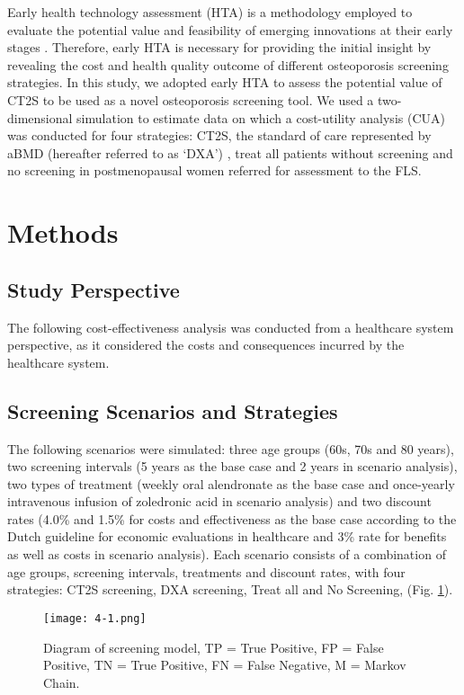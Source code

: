 Early health technology assessment (HTA) is a methodology employed to evaluate the potential value and feasibility of emerging innovations at their early stages \cite{4-12}. Therefore, early HTA is necessary for providing the initial insight by revealing the cost and health quality outcome of different osteoporosis screening strategies. In this study, we adopted early HTA to assess the potential value of CT2S to be used as a novel osteoporosis screening tool. We used a two-dimensional simulation to estimate data on which a cost-utility analysis (CUA) was conducted for four strategies: CT2S, the standard of care represented by aBMD (hereafter referred to as `DXA') \cite{4-13}, treat all patients without screening and no screening in postmenopausal women referred for assessment to the FLS.

\section{Methods}
\subsection{Study Perspective}

The following cost-effectiveness analysis was conducted from a healthcare system perspective, as it considered the costs and consequences incurred by the healthcare system.

\subsection{Screening Scenarios and Strategies}

The following scenarios were simulated: three age groups (60s, 70s and 80 years), two screening intervals (5 years as the base case and 2 years in scenario analysis), two types of treatment (weekly oral alendronate as the base case and once-yearly intravenous infusion of zoledronic acid in scenario analysis) and two discount rates (4.0\% and 1.5\% for costs and effectiveness as the base case according to the Dutch guideline for economic evaluations in healthcare \cite{4-14} and 3\% rate for benefits as well as costs in scenario analysis). Each scenario consists of a combination of age groups, screening intervals, treatments and discount rates, with four strategies: CT2S screening, DXA screening, Treat all and No Screening, (Fig. \ref{fig:4-1}).

\begin{figure}[!h]
\centering
\texttt{[image: 4-1.png]}
\caption{Diagram of screening model, TP = True Positive, FP = False Positive, TN = True Positive, FN = False Negative, M = Markov Chain.}
\label{fig:4-1}
\end{figure}

